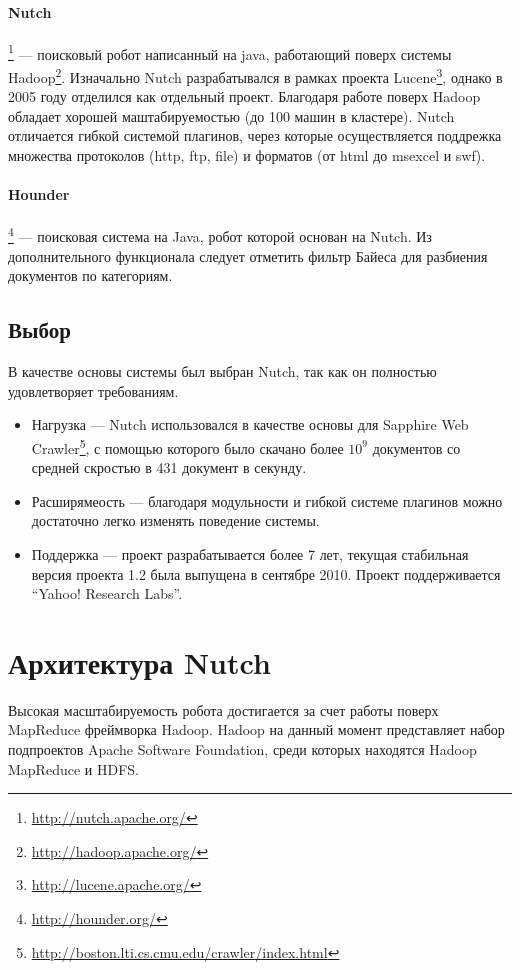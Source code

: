 \paragraph{Nutch}\footnote{\href{http://nutch.apache.org/}{http://nutch.apache.org/}} --- поисковый робот написанный на java, работающий поверх системы Hadoop\footnote{\href{http://hadoop.apache.org/}{http://hadoop.apache.org/}}. Изначально Nutch разрабатывался в рамках проекта Lucene\footnote{\href{http://lucene.apache.org/}{http://lucene.apache.org/}}, однако в 2005 году отделился как отдельный проект. Благодаря работе поверх Hadoop обладает хорошей маштабируемостью (до 100 машин в кластере). Nutch отличается гибкой системой плагинов, через которые осуществляется поддрежка множества протоколов (http, ftp, file) и форматов (от html до msexcel и swf).
\paragraph{Hounder}\footnote{\href{http://hounder.org/}{http://hounder.org/}} --- поисковая система на Java, робот которой основан на Nutch. Из дополнительного функционала следует отметить фильтр Байеса для разбиения документов по категориям.

\subsection{Выбор}
В качестве основы системы был выбран Nutch, так как он полностью удовлетворяет требованиям.
\begin{itemize}
 \item Нагрузка --- Nutch использовался в качестве основы для Sapphire Web Crawler\footnote{\href{http://boston.lti.cs.cmu.edu/crawler/index.html}{http://boston.lti.cs.cmu.edu/crawler/index.html}}, с помощью которого было скачано более $10^{9}$ документов со средней скростью в 431 документ в секунду.
 \item Расширямеость --- благодаря модульности и гибкой системе плагинов можно достаточно легко изменять поведение системы.
 \item Поддержка --- проект разрабатывается более 7 лет, текущая стабильная версия проекта 1.2 была выпущена в сентябре 2010. Проект поддерживается ``Yahoo! Research Labs''.
\end{itemize}

\section{Архитектура Nutch}
Высокая масштабируемость робота достигается за счет работы поверх MapReduce фреймворка Hadoop\cite{hadoopdefguide}. Hadoop на данный момент представляет набор подпроектов Apache Software Foundation, среди которых находятся Hadoop MapReduce и HDFS. 
